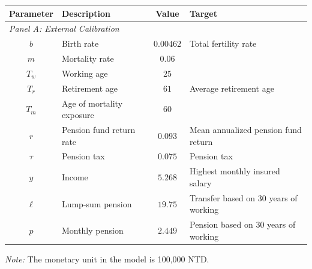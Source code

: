 \begin{threeparttable}
    \begin{tabularx}{\linewidth}{@{}c>{\raggedright\arraybackslash}Xc>{\raggedright\arraybackslash}X@{}}
        \toprule
        Parameter & Description & Value & Target \\
        \midrule
        \multicolumn{4}{l}{\textit{Panel A: External Calibration}} \\
        \addlinespace
        $b$ & Birth rate & $0.00462$ & Total fertility rate \\
        $m$ & Mortality rate & $0.06$ &  \\
        $T_w$ & Working age & $25$ &  \\
        $T_r$ & Retirement age & $61$ & Average retirement age \\
        $T_m$ & Age of mortality exposure & $60$ &  \\
        $r$ & Pension fund return rate & $0.093$ & Mean annualized pension fund return \\
        $\tau$ & Pension tax & $0.075$ & Pension tax \\
        $y$ & Income & $5.268$ & Highest monthly insured salary \\
        $\ell$ & Lump-sum pension & $19.75$ & Transfer based on 30 years of working \\
        $p$ & Monthly pension & $2.449$ & Pension based on 30 years of working \\
        \bottomrule
    \end{tabularx}

    \begin{tablenotes}[flushleft]
        \footnotesize
        \item \textit{Note:} The monetary unit in the model is 100,000 NTD.
    \end{tablenotes}
\end{threeparttable}
